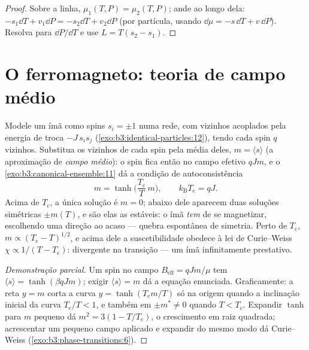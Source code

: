 \begin{proof}
Sobre a linha, $\mu_1(T, P) = \mu_2(T, P)$; ande ao longo dela:
$-s_1\dd T + v_1\dd P = -s_2\dd T + v_2\dd P$ (por partícula, usando
$\dd\mu = -s\,\dd T + v\,\dd P$). Resolva para $\dd P/\dd T$ e use
$L = T(s_2 - s_1)$.
\end{proof}

\section{O ferromagneto: teoria de campo médio}

\begin{theorem}\label{thm:b3:phase-transitions:meanfield}
Modele um ímã como spins $s_i = \pm1$ numa rede, com vizinhos
acoplados pela energia de troca $-J\,s_is_j$
(\cref{exo:b3:identical-particles:12}), tendo cada spin $q$
vizinhos. Substitua os vizinhos de cada spin pela média deles, $m =
\langle s\rangle$ (a aproximação de \emph{campo médio}): o spin
fica então no campo efetivo $qJm$, e
o \cref{exo:b3:canonical-ensemble:11} dá a condição de
autoconsistência
\[
m = \tanh\!\Big(\frac{T_{\text{c}}}{T}\,m\Big) , \qquad
k_{\text{B}}T_{\text{c}} = qJ .
\]
Acima de $T_{\text{c}}$, a única solução é $m = 0$; abaixo dele
aparecem duas soluções simétricas $\pm m(T)$, e são elas as estáveis: o
ímã \emph{tem} de se magnetizar, escolhendo uma direção ao acaso ---
quebra espontânea de simetria. Perto de $T_{\text{c}}$, $m \propto
(T_{\text{c}} - T)^{1/2}$, e acima dele a suscetibilidade obedece à
lei de Curie--Weiss $\chi \propto 1/(T - T_{\text{c}})$:
divergente na transição --- um ímã infinitamente prestativo.
\end{theorem}

\begin{proof}[Demonstração parcial]
Um spin no campo $B_{\text{eff}} = qJm/\mu$ tem $\langle s\rangle =
\tanh(\beta qJm)$; exigir $\langle s\rangle = m$ dá a
equação enunciada. Graficamente: a reta $y = m$ corta a curva $y =
\tanh(T_{\text{c}}m/T)$ só na origem quando a inclinação inicial da
curva $T_{\text{c}}/T < 1$, e também em $\pm m^* \neq 0$ quando
$T < T_{\text{c}}$. Expandir $\tanh$ para $m$ pequeno
dá $m^2 = 3(1 - T/T_{\text{c}})$, o crescimento em raiz quadrada;
acrescentar um pequeno campo aplicado e expandir do mesmo modo dá
Curie--Weiss (\cref{exo:b3:phase-transitions:6}).
\end{proof}

